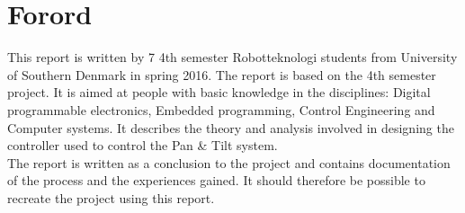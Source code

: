 \section*{Forord}

This report is written by 7 4th semester Robotteknologi students from University of Southern Denmark in spring 2016. The report is based on the 4th semester project.
It is aimed at people with basic knowledge in the disciplines: Digital programmable electronics, Embedded programming, Control Engineering and Computer systems.
It describes the theory and analysis involved in designing the controller used to control the Pan \& Tilt system.\\
The report is written as a conclusion to the project and contains documentation of the process and the experiences gained. It should therefore be possible to recreate the project using this report.
